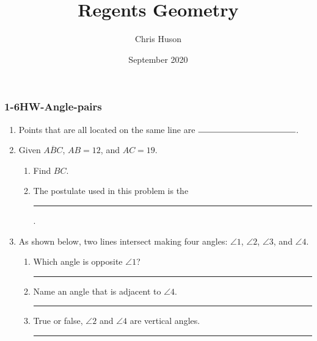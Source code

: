 \documentclass[12pt, twoside]{article}
\title{Regents Geometry}
\author{Chris Huson}
\date{September 2020}
\begin{document}
\subsubsection*{1-6HW-Angle-pairs}
\begin{enumerate}
\item Points that are all located on the same line are $\rule{4cm}{0.15mm}$. \bigskip

\item Given $\overline{ABC}$, $AB=12$, and $AC=19$.
  \begin{enumerate}
    \item Find ${BC}$.\\[1.5cm]
       \vspace{2cm}
    \item The postulate used in this problem is the \rule{6cm}{0.15mm}.
  \end{enumerate}

\item As shown below, two lines intersect making four angles: $\angle 1$, $\angle 2$, $\angle 3$, and $\angle 4$.
      \begin{center}
      \end{center}
      \begin{enumerate}
      \item Which angle is opposite $\angle 1$? \rule{4cm}{0.15mm} \bigskip
      \item Name an angle that is adjacent to $\angle 4$. \rule{4cm}{0.15mm} \bigskip
      \item True or false, $\angle 2$ and $\angle 4$ are vertical angles. \rule{3cm}{0.15mm}
    \end{enumerate}


\end{enumerate}
\end{document}
